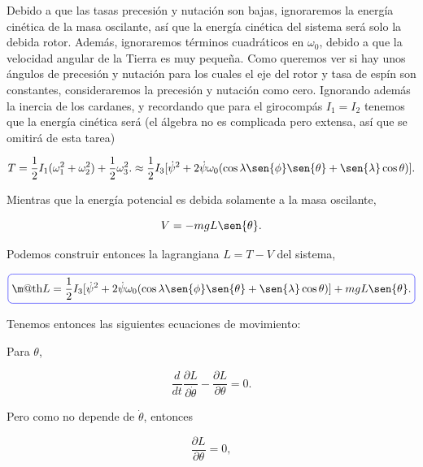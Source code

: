 \documentclass[a4paper,10pt]{article}
\makeatletter
\numberwithin{equation}{section}
\newcommand*{\boxcolor}{blue}
\renewcommand{\boxed}[1]{\textcolor{\boxcolor}{%
\tikz[baseline={([yshift=-1ex]current bounding box.center)}] \node [rectangle, minimum width=1ex,rounded corners,draw] {\normalcolor\m@th$\displaystyle#1$};}}
\makeatother
\begin{document}
Debido a que las tasas precesión y nutación son bajas, ignoraremos la energía 
cinética de la masa oscilante, así que la energía cinética del sistema será solo 
la debida rotor. Además, ignoraremos términos cuadráticos en $\omega_0$, debido a que 
la velocidad angular de la Tierra es muy pequeña. Como queremos ver si hay unos 
ángulos de precesión y nutación para los cuales el eje del rotor y tasa de espín 
son constantes, consideraremos la precesión y nutación como cero. Ignorando además 
la inercia de los cardanes, y recordando que para el girocompás $I_1=I_2$ tenemos 
que la energía cinética será (el álgebra no es complicada pero extensa, así que 
se omitirá de esta tarea)

\begin{equation}
 T = \frac{1}{2}I_1 (\omega_1^2 + \omega_2^2) + \frac{1}{2}\omega_3^2. \approx 
 \frac{1}{2}I_3[\dot{\psi}^2 + 2\dot{\psi}\omega_0(\cos{\lambda}\sen{\phi}\sen{\theta} + 
 \sen{\lambda}\cos{\theta})].
\end{equation}

Mientras que la energía potencial es debida solamente a la masa oscilante,

\begin{equation}
 V = - mgL\sen{\theta}.
\end{equation}

Podemos construir entonces la lagrangiana $L = T - V$ del sistema,

\begin{equation}
 \boxed{L = \frac{1}{2}I_3[\dot{\psi}^2 + 2\dot{\psi}\omega_0(\cos{\lambda}\sen{\phi}\sen{\theta} + 
 \sen{\lambda}\cos{\theta})] + mgL\sen{\theta}.}
 \label{eq:lagrangianaGirocompas}
\end{equation}

Tenemos entonces las siguientes ecuaciones de movimiento:

\vspace{.3cm}

Para $\theta$, 

\begin{equation}
 \frac{d}{dt}\frac{\partial L}{\partial \dot{\theta}} - \frac{\partial L}{\partial \theta} = 0.
\end{equation}

Pero como  no depende de $\dot{\theta}$, entonces 

\begin{equation}
 \frac{\partial L}{\partial \theta} = 0,
\end{equation}
\end{document}
